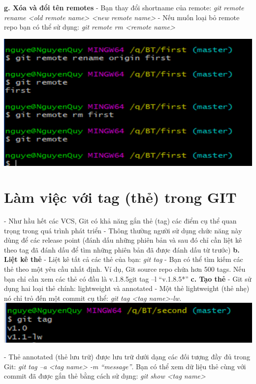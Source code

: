 \documentclass[12pt,a4paper]{report}
\begin{document}
	\label{fig:screenshot040}\vskip 0.4cm\vskip 0.4cm

{\bf g. Xóa và đổi tên remotes} \vskip 0.4cm
- Bạn thay đổi shortname của remote: {\it git remote rename <old remote name> <new remote name>}\vskip 0.4cm
- Nếu muốn loại bỏ remote repo  bạn có thể sử dụng: {\it git remote rm <remote name> }
\vskip 0.4cm

	\includegraphics[width=0.8\linewidth]{screenshot041}

	\label{fig:screenshot041}
\newpage

			
\section{Làm việc với tag (thẻ) trong GIT}
\hspace{0.6cm}{\bf a. Gắn thẻ} \vskip 0.4cm
- Như hầu hết các VCS, Git có khả năng gắn thẻ (tag) các điểm cụ thể quan trọng trong quá trình phát triển\vskip 0.4cm
- Thông thường người sử dụng chức năng này dùng để các release point (đánh dấu những phiên bản và sau đó chỉ cần liệt kê theo tag đã đánh dấu để tìm những phiên bản đã được đánh dấu từ trước)\vskip 0.4cm
{\bf b. Liệt kê thẻ} \vskip 0.4cm
- Liệt kê tất cả các thẻ của bạn: \textit{git tag}\vskip 0.4cm
- Bạn có thể tìm kiếm các thẻ theo một yêu cầu nhất định. Ví dụ, Git source repo chứa hơn 500 tags. Nếu bạn chỉ cần xem các thẻ có đầu là v.1.8.5git tag –l “v.1.8.5*”\vskip 0.4cm
{\bf c. Tạo thẻ} \vskip 0.4cm
- Git sử dụng hai loại thẻ chính: lightweight và annotated\vskip 0.4cm
- Một thẻ lightweight (thẻ nhẹ) nó chỉ trỏ đến một commit cụ thể: {\it git tag <tag name>-lw.} \vskip 0.4cm
	\includegraphics[width=0.8\linewidth]{screenshot042}

	\label{fig:screenshot042}
\vskip 0.4cm\vskip 0.4cm
- Thẻ annotated (thẻ lưu trữ) được lưu trữ dưới dạng các đối tượng đầy đủ trong Git: {\it git tag –a <tag name> -m “message”}. Bạn có thể xem dữ liệu thẻ cùng với commit đã được gắn thẻ bằng cách sử dụng: {\it git show <tag name>}\vskip 0.4cm
\end{document}
